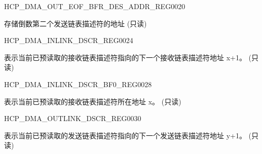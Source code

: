 \begin{register}{H}{CP\_DMA\_OUT\_EOF\_BFR\_DES\_ADDR\_REG}{\hexprefix{}0020}\label{regdesc:CPDMAOUTEOFBFRDESADDRREG}
%
\regnewline%
\begin{regdesc}\begin{reglist}
\label{fielddesc:CPDMAOUTEOFBFRDESADDR}\item [CP\_DMA\_OUT\_EOF\_BFR\_DES\_ADDR] 存储倒数第二个发送链表描述符的地址 (只读)
\end{reglist}\end{regdesc}
\end{register}


\begin{register}{H}{CP\_DMA\_INLINK\_DSCR\_REG}{\hexprefix{}0024}\label{regdesc:CPDMAINLINKDSCRREG}
%
\regnewline%
\begin{regdesc}\begin{reglist}
\label{fielddesc:CPDMAINLINKDSCR}\item [CP\_DMA\_INLINK\_DSCR] 表示当前已预读取的接收链表描述符指向的下一个接收链表描述符地址 x+1。 (只读)
\end{reglist}\end{regdesc}
\end{register}


\begin{register}{H}{CP\_DMA\_INLINK\_DSCR\_BF0\_REG}{\hexprefix{}0028}\label{regdesc:CPDMAINLINKDSCRBF0REG}
%
\regnewline%
\begin{regdesc}\begin{reglist}
\label{fielddesc:CPDMAINLINKDSCRBF0}\item [CP\_DMA\_INLINK\_DSCR\_BF0] 表示当前已预读取的接收链表描述符所在地址 x。 (只读)
\end{reglist}\end{regdesc}
\end{register}


\begin{register}{H}{CP\_DMA\_OUTLINK\_DSCR\_REG}{\hexprefix{}0030}\label{regdesc:CPDMAOUTLINKDSCRREG}
%
\regnewline%
\begin{regdesc}\begin{reglist}
\label{fielddesc:CPDMAOUTLINKDSCR}\item [CP\_DMA\_OUTLINK\_DSCR] 表示当前已预读取的发送链表描述符指向的下一个发送链表描述符地址 y+1。 (只读)
\end{reglist}\end{regdesc}
\end{register}


